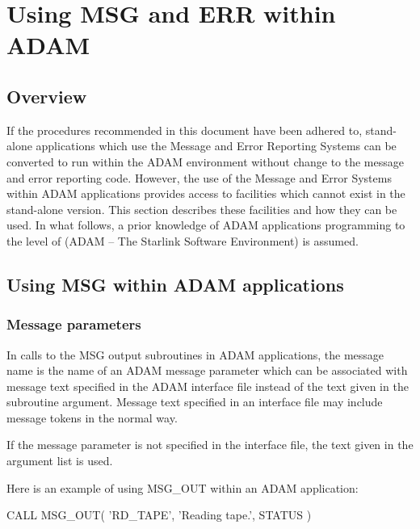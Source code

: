 \documentclass[twoside,11pt]{starlink}
\begin{document}
\newpage
\section{Using MSG and ERR within ADAM \label{adam_sect}}

\subsection{Overview}

If the procedures recommended in this document have been adhered to,
stand-alone applications which use the Message and Error Reporting Systems can
be converted to run within the ADAM environment without change to the message
and error reporting code.
However, the use of the Message and Error Systems within ADAM applications
provides access to facilities which cannot exist in the stand-alone version.
This section describes these facilities and how they can be used.
In what follows, a prior knowledge of ADAM applications programming to the
level of
 (ADAM -- The Starlink Software Environment) is assumed.


\subsection{Using MSG within ADAM applications \label{adam_msg}}

\subsubsection{Message parameters \label{mespar_sect}}
In calls to the MSG output subroutines in ADAM applications, the
message name is the name of an ADAM  message parameter which
can be associated with message text specified in the ADAM interface file
instead of the text given in the subroutine argument.
Message text specified in an interface file may include message tokens in the
normal way.

If the message parameter is not specified in the interface file,
the text given in the argument list is used.

Here is an example of using MSG\_OUT within an ADAM application:

\begin {small}
\begin{terminalv}
CALL MSG_OUT( 'RD_TAPE', 'Reading tape.', STATUS )
\end{terminalv}
\end {small}
\end{document}
